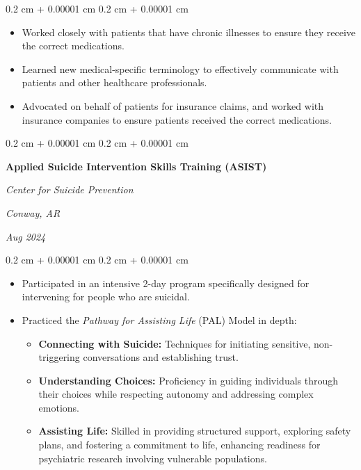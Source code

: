 \documentclass[10pt, letterpaper]{article}
\newenvironment{highlights}{
    \begin{itemize}[
        topsep=0.10 cm,
        parsep=0.10 cm,
        partopsep=0pt,
        itemsep=0pt,
        leftmargin=0.4 cm + 10pt
    ]
}{
    \end{itemize}
} %
\newenvironment{highlightsforbulletentries}{
    \begin{itemize}[
        topsep=0.10 cm,
        parsep=0.10 cm,
        partopsep=0pt,
        itemsep=0pt,
        leftmargin=10pt
    ]
}{
    \end{itemize}
} %
\newenvironment{onecolentry}{
    \begin{adjustwidth}{
        0.2 cm + 0.00001 cm
    }{
        0.2 cm + 0.00001 cm
    }
}{
    \end{adjustwidth}
} %
\newenvironment{twocolentry}[2][]{
    \onecolentry
    \def\secondColumn{#2}
    \setcolumnwidth{\fill, 4.5 cm}
    \begin{paracol}{2}
}{
    \switchcolumn \raggedleft \secondColumn
    \end{paracol}
    \endonecolentry
} %
\begin{document}
        \vspace{0.10 cm}
        \begin{onecolentry}
            \begin{highlights}
                \item Worked closely with patients that have chronic illnesses to ensure they receive the correct medications.
                \item Learned new medical-specific terminology to effectively communicate with patients and other healthcare professionals.
                \item Advocated on behalf of patients for insurance claims, and worked with insurance companies to ensure patients received the correct medications.
            \end{highlights}
        \end{onecolentry}


        \vspace{0.2 cm}

        \begin{twocolentry}{
        \textit{Conway, AR}    
            
        \textit{Aug 2024}}
            \textbf{Applied Suicide Intervention Skills Training (ASIST)}
            
            \textit{Center for Suicide Prevention}
        \end{twocolentry}

        \vspace{0.10 cm}
        \begin{onecolentry}
            \begin{highlights}
                \item Participated in an intensive 2-day program specifically designed for intervening for people who are suicidal.  
                \item Practiced the \textit{Pathway for Assisting Life} (PAL) Model in depth:
                \begin{highlightsforbulletentries}
                    \item \textbf{Connecting with Suicide:} Techniques for initiating sensitive, non-triggering conversations and establishing trust.
                    \item \textbf{Understanding Choices:} Proficiency in guiding individuals through their choices while respecting autonomy and addressing complex emotions.
                    \item \textbf{Assisting Life:} Skilled in providing structured support, exploring safety plans, and fostering a commitment to life, enhancing readiness for psychiatric research involving vulnerable populations.
                \end{highlightsforbulletentries}
            \end{highlights}
        \end{onecolentry}
\end{document}

